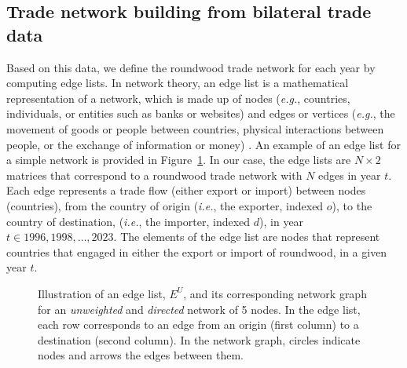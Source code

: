 \documentclass[
  authoryear,
  review,
  3p]{elsarticle}
\begin{document}
\subsection{Trade network building from bilateral trade
data}\label{trade-network-building-from-bilateral-trade-data}

Based on this data, we define the roundwood trade network for each year
by computing edge lists. In network theory, an edge list is a
mathematical representation of a network, which is made up of nodes
(\emph{e.g.}, countries, individuals, or entities such as banks or
websites) and edges or vertices (\emph{e.g.}, the movement of goods or
people between countries, physical interactions between people, or the
exchange of information or money)
\citep{albert_statistical_2002, newman_structure_2003}. An example of an
edge list for a simple network is provided in
Figure~\ref{fig-edge-list-unweighted}. In our case, the edge lists are
\(N \times 2\) matrices that correspond to a roundwood trade network
with \(N\) edges in year \(t\). Each edge represents a trade flow
(either export or import) between nodes (countries), from the country of
origin (\emph{i.e.}, the exporter, indexed \(o\)), to the country of
destination, (\emph{i.e.}, the importer, indexed \(d\)), in year
\(t \in {1996,1998,…,2023}\). The elements of the edge list are nodes
that represent countries that engaged in either the export or import of
roundwood, in a given year \(t\).

\begin{figure}[t]


\caption{\label{fig-edge-list-unweighted}Illustration of an edge list,
\(E^U\), and its corresponding network graph for an \textit{unweighted}
and \textit{directed} network of 5 nodes. In the edge list, each row
corresponds to an edge from an origin (first column) to a destination
(second column). In the network graph, circles indicate nodes and arrows
the edges between them.}

\end{figure}%
\end{document}
